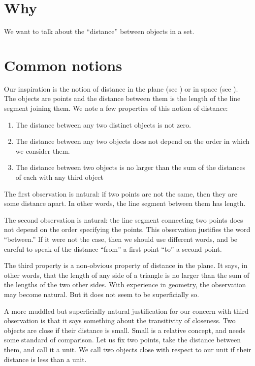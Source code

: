 

\section*{Why}

We want to talk about the ``distance'' between objects in a set.

\section*{Common notions}

Our inspiration is the notion of distance in the plane (see ) or in space (see ).
The objects are points and the distance between them is the length of the line segment joining them.
We note a few properties of this notion of distance:
    \begin{enumerate}
      \item The distance between any two distinct objects is not zero.
      \item The distance between any two objects does not depend on the order in which we consider them.
      \item The distance between two objects is no larger than the sum of the distances of each with any third object
    \end{enumerate}

The first observation is natural: if two points are not the same, then they are some distance apart.
In other words, the line segment between them has length.

The second observation is natural: the line segment connecting two points does not depend on the order specifying the points.
This observation justifies the word ``between.''
If it were not the case, then we should use different words, and be careful to speak of the distance ``from'' a first point ``to'' a second point.

The third property is a non-obvious property of distance in the plane.
It says, in other words, that the length of any side of a triangle is no larger than the sum of the lengths of the two other sides.
With experience in geometry, the observation may become natural.
But it does not seem to be superficially so.

A more muddled but superficially natural justification for our concern with third observation is that it says something about the transitivity of closeness.
Two objects are close if their distance is small.
Small is a relative concept, and needs some standard of comparison.
Let us fix two points, take the distance between them, and call it a unit.
We call two objects close with respect to our unit if their distance is less than a unit.

